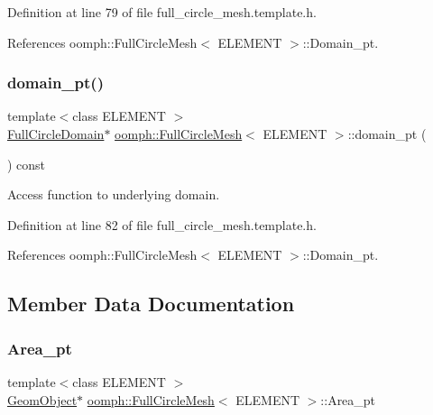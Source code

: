 Definition at line 79 of file full\+\_\+circle\+\_\+mesh.\+template.\+h.



References oomph\+::\+Full\+Circle\+Mesh$<$ E\+L\+E\+M\+E\+N\+T $>$\+::\+Domain\+\_\+pt.

\mbox{\label{classoomph_1_1FullCircleMesh_ae912045c32ae004812d61a58161e531f}} 
\subsubsection{\texorpdfstring{domain\+\_\+pt()}{domain\_pt()}\hspace{0.1cm}{\footnotesize\ttfamily [2/2]}}
{\footnotesize\ttfamily template$<$class E\+L\+E\+M\+E\+NT $>$ \\
\hyperlink{classoomph_1_1FullCircleDomain}{Full\+Circle\+Domain}$\ast$ \hyperlink{classoomph_1_1FullCircleMesh}{oomph\+::\+Full\+Circle\+Mesh}$<$ E\+L\+E\+M\+E\+NT $>$\+::domain\+\_\+pt (\begin{DoxyParamCaption}{ }\end{DoxyParamCaption}) const\hspace{0.3cm}{\ttfamily [inline]}}



Access function to underlying domain. 



Definition at line 82 of file full\+\_\+circle\+\_\+mesh.\+template.\+h.



References oomph\+::\+Full\+Circle\+Mesh$<$ E\+L\+E\+M\+E\+N\+T $>$\+::\+Domain\+\_\+pt.



\subsection{Member Data Documentation}
\mbox{\label{classoomph_1_1FullCircleMesh_a0eb9088080115746b8570264f444c37f}} 
\subsubsection{\texorpdfstring{Area\+\_\+pt}{Area\_pt}}
{\footnotesize\ttfamily template$<$class E\+L\+E\+M\+E\+NT $>$ \\
\hyperlink{classoomph_1_1GeomObject}{Geom\+Object}$\ast$ \hyperlink{classoomph_1_1FullCircleMesh}{oomph\+::\+Full\+Circle\+Mesh}$<$ E\+L\+E\+M\+E\+NT $>$\+::Area\+\_\+pt\hspace{0.3cm}{\ttfamily [protected]}}



